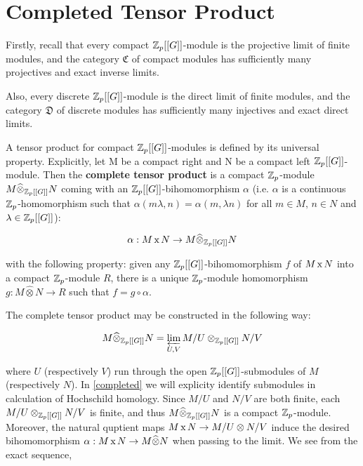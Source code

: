 


\section{Completed Tensor Product \label{CTP}}

Firstly, recall that every compact $\mathbb Z_p[[G]]$-module is the
projective limit of finite modules, and the category $\mathfrak C$
of compact modules has sufficiently many projectives and exact
inverse limits.

Also, every discrete $\mathbb Z_p[[G]]$-module is the direct limit of
finite modules, and the category $\mathfrak D$ of discrete modules
has sufficiently many injectives and exact direct limits.

A tensor product for compact $\mathbb Z_p [[G]]$-modules is defined by its
universal property. Explicitly, let M be a compact right and N be
a compact left $\mathbb Z_p [[G]]$-module. Then the \textbf{complete
tensor product} is a compact $\mathbb Z_p$-module $M\widehat \otimes_{\mathbb Z_p
[[G]]} N$ coming with an $\mathbb Z_p [[G]]$-bihomomorphism $\alpha$ (i.e.
$\alpha$ is a continuous $\mathbb Z_p$-homomorphism such that $\alpha
(m\lambda, n) = \alpha (m, \lambda n)$ for all $m\in M, \, n\in N$
and $\lambda \in \mathbb Z_p [[G]]$):

$$\alpha:M\, \text x \, N \rightarrow M\widehat \otimes_{\mathbb Z_p
[[G]]} N$$

with the following property: given any $\mathbb Z_p [[G]]$-bihomomorphism
$f$ of $M\, \text x \, N$ into a compact $\mathbb Z_p$-module $R$, there
is a unique $\mathbb Z_p$-module homomorphism $g: M \widehat \otimes N
\rightarrow R$ such that $f = g \circ \alpha$.

The complete tensor product may be constructed in the
following way:

$$M\widehat \otimes_{\mathbb Z_p [[G]]} N = \varprojlim_{U,V} M/U
\otimes_{\mathbb Z_p[[G]]} N/V$$

where $U$ (respectively $V$) run through the open
$\mathbb Z_p[[G]]$-submodules of $M$ (respectively $N$). In \ref{completed} we will explicity identify submodules in calculation of Hochschild homology. Since $M/U$ and $N/V$ are both finite, each $M/U \otimes_{\mathbb Z_p[[G]]} N/V$ is finite, and thus $M\widehat \otimes_{\mathbb Z_p [[G]]} N$ is a compact $\mathbb Z_p$-module. Moreover, the natural quptient maps $M\, \text x \, N \rightarrow M/U \otimes N/V$ induce the desired bihomomorphism $\alpha: M\, \text x \, N \rightarrow M\widehat \otimes N$ when passing to the limit. We see from the exact sequence,

